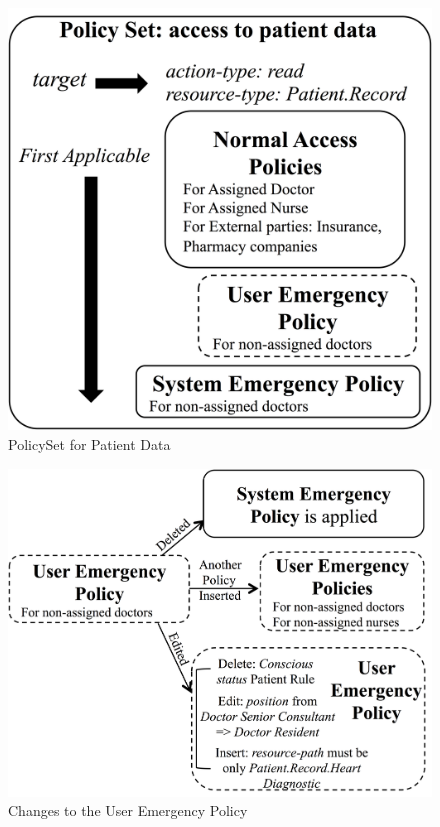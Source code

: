 \begin{figure}[ht!]
  \centering
  \includegraphics[scale=0.5]{fig/PolicySet.png}
  \caption{PolicySet for Patient Data}
  \label{fig:policyset}
\end{figure}
\begin{figure}[ht!]
  \centering
  \includegraphics[scale=0.5]{fig/PolicyChange.png}
  \caption{Changes to the User Emergency Policy}
  \label{fig:policychanges}
\end{figure}

